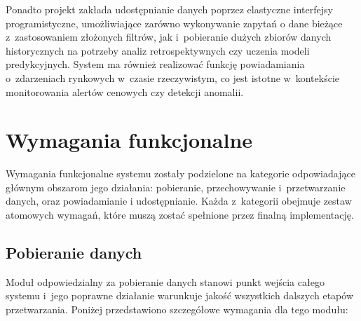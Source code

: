 Ponadto projekt zakłada udostępnianie danych poprzez elastyczne interfejsy programistyczne, umożliwiające zarówno
wykonywanie zapytań o dane bieżące z~zastosowaniem złożonych filtrów, jak i~pobieranie dużych zbiorów danych historycznych
na potrzeby analiz retrospektywnych czy uczenia modeli predykcyjnych.
System ma również realizować funkcję powiadamiania o~zdarzeniach rynkowych w~czasie rzeczywistym, co jest istotne
w~kontekście monitorowania alertów cenowych czy detekcji anomalii.


\section{Wymagania funkcjonalne}
\label{sec:wymagania_funkcjonalne}

Wymagania funkcjonalne systemu zostały podzielone na kategorie odpowiadające głównym obszarom jego działania:
pobieranie, przechowywanie i~przetwarzanie danych, oraz powiadamianie i udostępnianie.
Każda z~kategorii obejmuje zestaw atomowych wymagań, które muszą zostać spełnione przez finalną implementację.

\subsection{Pobieranie danych}
\label{subsec:pobieranie_danych}

Moduł odpowiedzialny za pobieranie danych stanowi punkt wejścia całego systemu i~jego poprawne działanie warunkuje
jakość wszystkich dalszych etapów przetwarzania.
Poniżej przedstawiono szczegółowe wymagania dla tego modułu:

